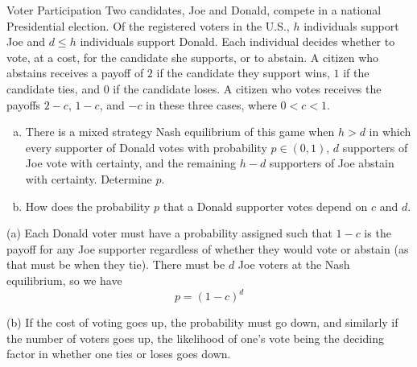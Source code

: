 \documentclass[8pt]{extarticle}
\begin{document}
  \begin{problem}{Voter Participation}
    Two candidates, Joe and Donald, compete in a national Presidential election. Of the registered voters in the U.S., $h$ individuals support Joe and $d\leq h$ individuals support Donald. Each individual decides whether to vote, at a cost, for the candidate she supports, or to abstain. A citizen who abstains receives a payoff of $2$ if the candidate they support wins, $1$ if the candidate ties, and $0$ if the candidate loses. A citizen who votes receives the payoffs $2-c$, $1-c$, and $-c$ in these three cases, where $0 < c < 1$.
    \begin{enumerate}[(a)]
      \item There is a mixed strategy Nash equilibrium of this game when $h > d$ in which every supporter of Donald votes with probability $p\in (0,1)$, $d$ supporters of Joe vote with certainty, and the remaining $h-d$ supporters of Joe abstain with certainty. Determine $p$.
      \item How does the probability $p$ that a Donald supporter votes depend on $c$ and $d$.
    \end{enumerate}
    \tcblower
    \begin{problem}{(a)}
      Each Donald voter must have a probability assigned such that $1-c$ is the payoff for any Joe supporter regardless of whether they would vote or abstain (as that must be when they tie). There must be $d$ Joe voters at the Nash equilibrium, so we have
      \[
        p = (1-c)^d
      \] 
    \end{problem}
    \begin{problem}{(b)}
      If the cost of voting goes up, the probability must go down, and similarly if the number of voters goes up, the likelihood of one's vote being the deciding factor in whether one ties or loses goes down.
    \end{problem}
  \end{problem}
\end{document}
